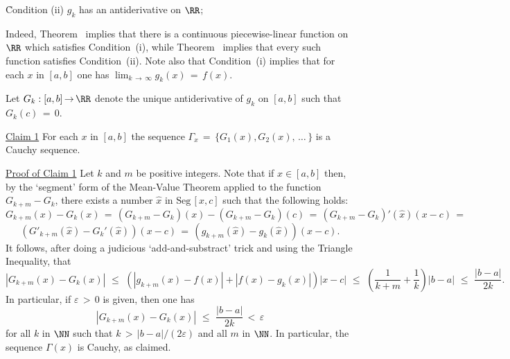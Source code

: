 {        \h Condition (ii) $g_{k}$ has an antiderivative on ${\RR}$;



\VA

\hspace*{\parindent}Indeed, Theorem~ implies that there is a continuous piecewise-linear function on ${\RR}$ which satisfies Condition~(i),
    while Theorem~ implies that every such function satisfies Condition~(ii).
    Note also that Condition~(i) implies that for each $x$ in $[a,b]$ one has ${\displaystyle \lim_{k \,{\rightarrow}\, {\infty}} g_{k}(x) \,=\, f(x)}$.

        Let $G_{k}:[a,b] \,{\rightarrow}\, {\RR}$ denote the unique antiderivative of $g_{k}$ on $[a,b]$ such that $G_{k}(c) \,=\, 0$.

\V

        \underline{Claim 1} For each $x$ in $[a,b]$ the sequence ${\Gamma}_{x} \,=\, \{G_{1}(x), G_{2}(x),\,{\ldots}\,\}$ is a Cauchy sequence.

        \underline{Proof of Claim 1} Let $k$ and $m$ be positive integers. Note that if $x{\in}[a,b]$ then, by the `segment' form of the Mean-Value Theorem applied to the function $G_{k+m} - G_{k}$, there exists a number $\hat{x}$ in ${\mbox{Seg}\,[x,c]}$ such that the following holds:
        \begin{displaymath}
        G_{k+m}(x) - G_{k}(x) \,=\, (G_{k+m} - G_{k})(x) - (G_{k+m} - G_{k})(c)
     \,=\, 
        (G_{k+m} - G_{k})'(\hat{x})(x-c) \,=\,
        \end{displaymath}
        \begin{displaymath}
         (G'_{k+m}(\hat{x}) - G_{k}'(\hat{x}))(x-c)
     \,=\, 
       (g_{k+m}(\hat{x}) - g_{k}(\hat{x}))(x-c).
        \end{displaymath}
    It follows, after doing a judicious `add-and-substract' trick and using the Triangle Inequality, that
        \begin{displaymath}
        |G_{k+m}(x) - G_{k}(x)|\,\,{\leq}\,\,\left(|g_{k+m}(x) - f(x)| + |f(x) - g_{k}(x)|\right)|x-c|\,\,{\leq}\,\,\left(\frac{1}{k+m} + \frac{1}{k}\right)|b-a|\,\,{\leq}\,\,\frac{|b-a|}{2k}.
        \end{displaymath}
    In particular, if ${\varepsilon}\,>\,0$ is given, then one has
        \begin{equation}
        \label{IneqE.83A}
        |G_{k+m}(x) - G_{k}(x)|\,\,{\leq}\,\,\frac{|b-a|}{2k}\,<\,{\varepsilon}
        \end{equation}
    for all $k$ in ${\NN}$ such that $k\,>\,|b-a|/(2{\varepsilon})$ and all $m$ in ${\NN}$. In particular, the sequence ${\Gamma}(x)$ is Cauchy, as claimed.

}
